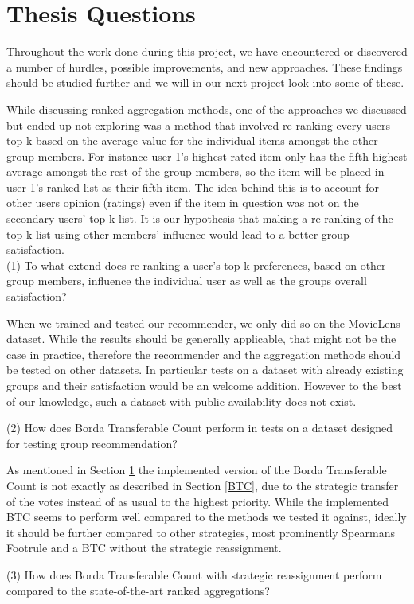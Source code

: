 \section{Thesis Questions}
Throughout the work done during this project, we have encountered or discovered a number of hurdles, possible improvements, and new approaches. These findings should be studied further and we will in our next project look into some of these.

While discussing ranked aggregation methods, one of the approaches we discussed but ended up not exploring was a method that involved re-ranking every users top-k based on the average value for the individual items amongst the other group members. For instance user 1's highest rated item only has the fifth highest average amongst the rest of the group members, so the item will be placed in user 1's ranked list as their fifth item. The idea behind this is to account for other users opinion (ratings) even if the item in question was not on the secondary users' top-k list. It is our hypothesis that making a re-ranking of the top-k list using other members' influence would lead to a better group satisfaction.\\

(1) To what extend does re-ranking a user's top-k preferences, based on other group members, influence the individual user as well as the groups overall satisfaction?

When we trained and tested our recommender, we only did so on the MovieLens dataset. While the results should be generally applicable, that might not be the case in practice, therefore the recommender and the aggregation methods should be tested on other datasets. In particular tests on a dataset with already existing groups and their satisfaction would be an welcome addition. However to the best of our knowledge, such a dataset with public availability does not exist. 

(2) How does Borda Transferable Count perform in tests on a dataset designed for testing group recommendation?

As mentioned in Section \ref{}  the implemented version of the Borda Transferable Count is not exactly as described in Section \ref{BTC}, due to the strategic transfer of the votes instead of as usual to the highest priority. While the implemented BTC seems to perform well compared to the methods we tested it against, ideally it should be further compared to other strategies, most prominently Spearmans Footrule and a BTC without the strategic reassignment.

(3) How does Borda Transferable Count with strategic reassignment perform compared to the state-of-the-art ranked aggregations?

